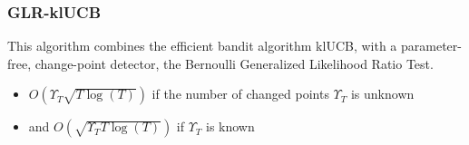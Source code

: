 \documentclass{beamer}
\begin{document}
    \begin{frame}
        \frametitle{GLR-klUCB}
        This algorithm combines the efficient bandit algorithm klUCB, with a parameter- free, change-point detector, the Bernoulli Generalized Likelihood Ratio Test.
        \begin{itemize}
            \item<1->  $ O\left(\Upsilon_T \sqrt{T \log\left(T\right)} \right)$ if the number of changed points $\Upsilon_T $ is unknown
            \item<2->   and $ O\left(\sqrt{\Upsilon_T T \log\left(T\right)} \right)$ if  $\Upsilon_T $ is known

        \end{itemize}
    \end{frame}
\end{document}
